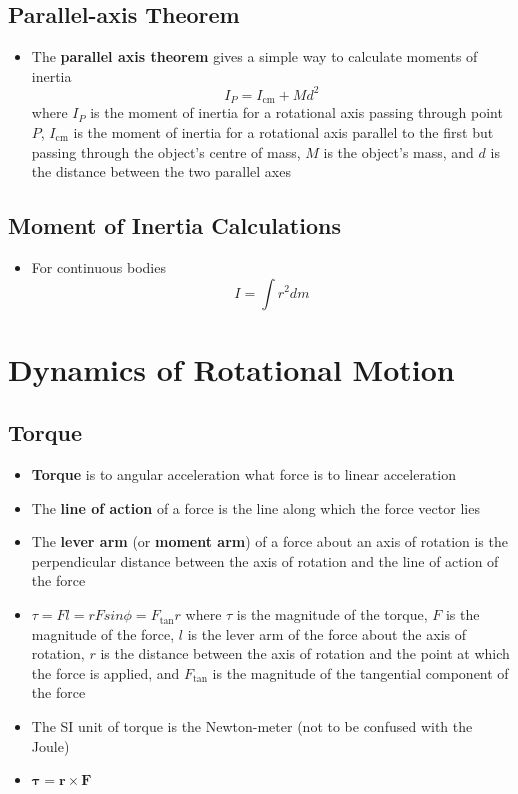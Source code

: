 \documentclass{article}
\begin{document}
\subsection{Parallel-axis Theorem}

\begin{itemize}
  \item The \textbf{parallel axis theorem} gives a simple way to calculate moments of inertia \[I_P=I_\textrm{cm}+Md^2\] where $I_P$ is the moment of inertia for a rotational axis passing through point $P$, $I_\textrm{cm}$ is the moment of inertia for a rotational axis parallel to the first but passing through the object's centre of mass, $M$ is the object's mass, and $d$ is the distance between the two parallel axes
\end{itemize}

\subsection{Moment of Inertia Calculations}

\begin{itemize}
  \item For continuous bodies \[I=\int r^2 dm\]
\end{itemize}

\section{Dynamics of Rotational Motion}

\subsection{Torque}

\begin{itemize}
  \item \textbf{Torque} is to angular acceleration what force is to linear acceleration

  \item The \textbf{line of action} of a force is the line along which the force vector lies

  \item The \textbf{lever arm} (or \textbf{moment arm}) of a force about an axis of rotation is the perpendicular distance between the axis of rotation and the line of action of the force

  \item $\tau=Fl=rFsin\phi=F_\textrm{tan}r$ where $\tau$ is the magnitude of the torque, $F$ is the magnitude of the force, $l$ is the lever arm of the force about the axis of rotation, $r$ is the distance between the axis of rotation and the point at which the force is applied, and $F_\textrm{tan}$ is the magnitude of the tangential component of the force

  \item The SI unit of torque is the Newton-meter (not to be confused with the Joule)

  \item $\boldsymbol\tau=\mathbf r\times\mathbf F$
\end{itemize}
\end{document}
